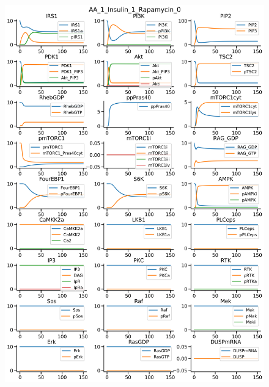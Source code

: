\documentclass{beamer}
\begin{document}
\begin{frame}
\begin{figure}
\begin{minipage}{0.45\textwidth}
        \includegraphics[width=\textwidth]{../simulations/ExtendedPI3KModel/validations/AAWithInsulinWithRapamycin/AA_1_Insulin_1_Rapamycin_0-6.png}
    \end{minipage}
\end{figure}
\end{frame}


\end{document}
